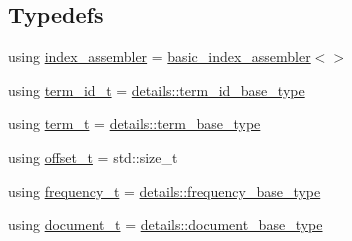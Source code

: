 \subsection*{Typedefs}
\begin{DoxyCompactItemize}
\item 
using \mbox{\hyperlink{namespaceirk_1_1index_af5df1bc3bb4579697ad99f238faace60}{index\+\_\+assembler}} = \mbox{\hyperlink{classirk_1_1index_1_1basic__index__assembler}{basic\+\_\+index\+\_\+assembler}}$<$$>$
\item 
using \mbox{\hyperlink{namespaceirk_1_1index_ae2ce3a02969196fe6dab4443ed2007d5}{term\+\_\+id\+\_\+t}} = \mbox{\hyperlink{namespaceirk_1_1index_1_1details_a03b015c00fec26f2586208453b6e99ba}{details\+::term\+\_\+id\+\_\+base\+\_\+type}}
\item 
using \mbox{\hyperlink{namespaceirk_1_1index_a7c2517c1f98e5b5f30ba3ab2f837caf6}{term\+\_\+t}} = \mbox{\hyperlink{namespaceirk_1_1index_1_1details_ae85cb57d6db703cac1c9eb5af11a03f2}{details\+::term\+\_\+base\+\_\+type}}
\item 
using \mbox{\hyperlink{namespaceirk_1_1index_ad66c0e72549ffc6b78a85158293bb47b}{offset\+\_\+t}} = std\+::size\+\_\+t
\item 
using \mbox{\hyperlink{namespaceirk_1_1index_aa2cb48e79abd95deb25bbdf36c0ea70f}{frequency\+\_\+t}} = \mbox{\hyperlink{namespaceirk_1_1index_1_1details_a4b657cb7a568be2f216aeb3eaff9e71b}{details\+::frequency\+\_\+base\+\_\+type}}
\item 
using \mbox{\hyperlink{namespaceirk_1_1index_af829dedea20da89f9b51b49d78f57006}{document\+\_\+t}} = \mbox{\hyperlink{namespaceirk_1_1index_1_1details_a2a13af82c5a304ec713fb875d59a5603}{details\+::document\+\_\+base\+\_\+type}}
\end{DoxyCompactItemize}

